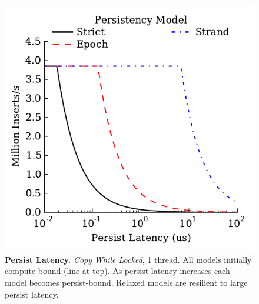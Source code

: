 \begin{figure}
  \centering
  \includegraphics[width=.55\linewidth]{PersistencyEval/Latency1Thread.pdf}
  \caption{\textbf{Persist Latency.} \emph{Copy While Locked}, 1 thread.  All models initially compute-bound (line at top).  As persist latency increases each model becomes persist-bound.  Relaxed models are resilient to large persist latency.}
  \label{fig::PersistLatency}
\end{figure}
